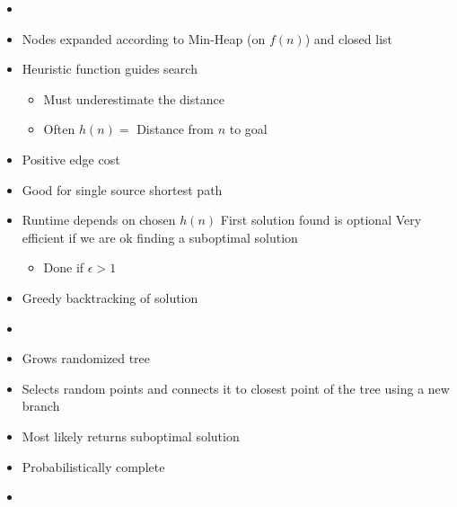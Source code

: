 \begin{itemize}
\begin{itemize}
\begin{itemize}
                    \item {}
                \end{itemize}
                \begin{itemize}
                    \item Nodes expanded according to Min-Heap (on $f(n)$) and closed list
                    \item Heuristic function guides search
                        \begin{itemize}
                            \item Must underestimate the distance
                            \item Often $h(n) =$ Distance from $n$ to goal
                        \end{itemize}
                    \item Positive edge cost
                    \item Good for single source shortest path
                    \item Runtime depends on chosen $h(n)$
                    \ipro First solution found is optional
                    \ipro Very efficient if we are ok finding a suboptimal solution
                        \begin{itemize}
                            \item Done if $\epsilon > 1$
                        \end{itemize}
                    \item Greedy backtracking of solution
                    \item {}
                \end{itemize}
                \begin{itemize}
                    \item Grows randomized tree
                    \item Selects random points and connects it to closest point of the tree using a new branch
                    \item Most likely returns suboptimal solution
                    \item Probabilistically complete
                    \item {}
                \end{itemize}
        \end{itemize}
\end{itemize}

